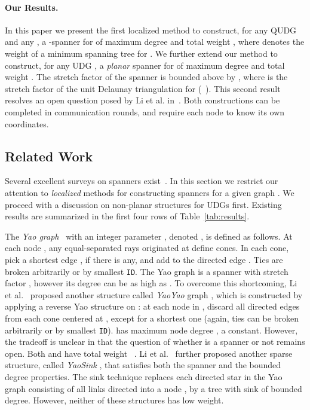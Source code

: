 \documentclass{llncs}
\newcommand{\id}{{\tt ID}}
\begin{document}
\paragraph{Our Results.}
In this paper we present the first localized method to construct, for any QUDG
 and any ,
a -spanner for  of maximum degree  and total weight , where
 denotes the weight of a minimum spanning tree for . We further extend
our method to construct, for any UDG ,  a \emph{planar} spanner for  of
maximum degree  and
total weight . The stretch factor of the spanner is bounded above by
, where  is the stretch factor of the
unit Delaunay triangulation for  (~\cite{LCW02}).
This second result resolves an open question
posed by Li et al. in~\cite{lws-ieee-04}.
Both constructions can be completed in  communication rounds,
and require each node to know its own coordinates.

\subsection{Related Work}
Several excellent surveys on spanners exist~\cite{Smid00,RajSurvey02,GK06,ns-gsn-07}.
In this section we restrict our attention to \emph{localized} methods for
constructing spanners for a given graph . We proceed with a discussion
on non-planar structures for UDGs first. Existing results are summarized
in the first four rows of Table~\ref{tab:results}.


The \emph{Yao graph}~\cite{Yao82} with an integer parameter , denoted ,
is defined as follows. At each node
, any  equal-separated rays originated at  define  cones.
In each cone, pick a shortest edge , if there is any, and add to 
the directed edge . Ties are broken arbitrarily or by
smallest \id. The Yao graph is a spanner with stretch factor
, however its degree can be as high as .
To overcome this shortcoming, Li et al.~\cite{li02sparse} proposed another
structure called \emph{YaoYao} graph , which is constructed by applying
a reverse Yao structure on : at each node  in , discard all
directed edges  from each cone centered at , except for
a shortest one (again, ties can be broken arbitrarily or by smallest \id).
 has maximum node degree ,
a constant. However, the tradeoff is unclear in that the question of
whether  is a spanner or not remains open. Both  and 
have total weight ~\cite{d-yys-08}.
Li et al.~\cite{WangLi03} further proposed another sparse structure,
called \emph{YaoSink} , that satisfies both the spanner and the
bounded degree properties. The sink technique replaces each directed star
in the Yao graph consisting of all links directed into
a node , by a tree  with sink  of bounded degree.
However, neither of these structures has low weight.
\end{document}
